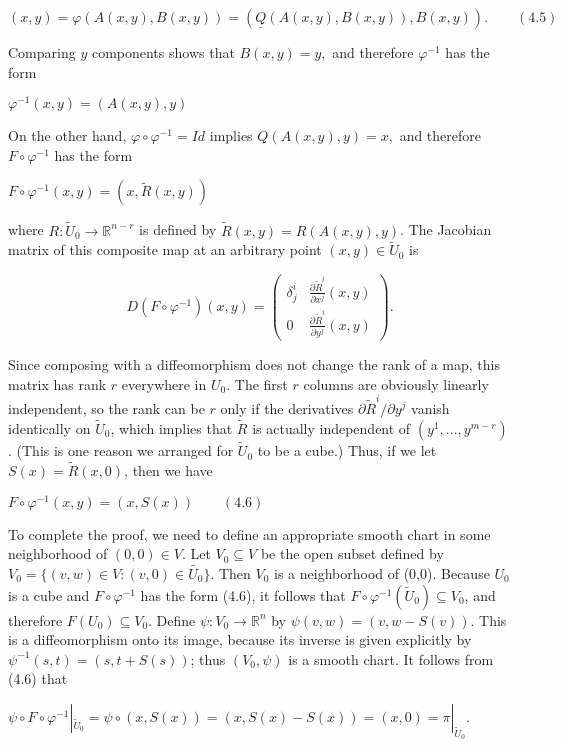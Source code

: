 \((x,y)=\varphi(A(x,y),B(x,y))=(\underline{Q}(A(x,y),B(x,y)),B(x,y)). \qquad (4.5)\)

Comparing \(y\) components shows that \(B(x,y)=y,\) and therefore \(\varphi^{-1}\) has the form

\(\varphi^{-1}(x,y)=(A(x,y),y)\)

On the other hand, \(\varphi\circ\varphi^{-1}=Id\) implies \(Q(A(x,y),y)=x,\) and therefore \(F\circ\varphi^{-1}\) has the form

\(F\circ\varphi^{-1}(x,y)=(x,\tilde{R}(x,y))\)

where \(R: \tilde{U}_{0}\rightarrow\mathbb{R}^{n-r}\) is defined by \(\tilde{R}(x,y)=R(A(x,y),y)\). The Jacobian matrix of this composite map at an arbitrary point \((x,y)\in\tilde{U}_{0}\) is

\[D(F\circ\varphi^{-1})(x,y)=
\begin{pmatrix}
\delta_{j}^{i} & \frac{\partial\tilde{R}^{l}}{\partial x^{j}}(x,y) \\
0 & \frac{\partial\tilde{R}^{i}}{\partial y^{j}}(x,y)
\end{pmatrix}.\]

Since composing with a diffeomorphism does not change the rank of a map, this matrix has rank \(r\) everywhere in \(U_{0}\). The first \(r\) columns are obviously linearly independent, so the rank can be \(r\) only if the derivatives \(\partial \tilde{R}^{i} / \partial y^{j}\) vanish identically on \(\tilde{U}_{0}\), which implies that \(\tilde{R}\) is actually independent of \((y^{1},...,y^{m-r})\). (This is one reason we arranged for \(\tilde{U}_{0}\) to be a cube.) Thus, if we let \(S(x)=\tilde{R}(x,0)\), then we have

\(F\circ\varphi^{-1}(x,y)=(x,S(x)) \qquad (4.6)\)

To complete the proof, we need to define an appropriate smooth chart in some neighborhood of \((0,0)\in V\). Let \(V_{0}\subseteq V\) be the open subset defined by \(V_{0}=\{(v,w)\in V:(v,0)\in\tilde{U_{0}}\}\). Then \(V_{0}\) is a neighborhood of (0,0). Because \(U_{0}\) is a cube and \(F\circ\varphi^{-1}\) has the form (4.6), it follows that \(F\circ\varphi^{-1}(\tilde{U}_{0})\subseteq V_{0}\), and therefore \(F(U_{0})\subseteq V_{0}\). Define \(\psi:V_{0}\rightarrow\mathbb{R}^{n}\) by \(\psi(v,w)=(v,w-S(v))\). This is a diffeomorphism onto its image, because its inverse is given explicitly by \(\psi^{-1}(s,t)=(s,t+S(s))\); thus \((V_{0},\psi)\) is a smooth chart. It follows from (4.6) that

\(\psi \circ F \circ \varphi^{-1} |_{\tilde{U}_0} = \psi \circ (x, S(x)) = (x, S(x) - S(x)) = (x, 0) = \pi |_{\tilde{U}_0}.\)



